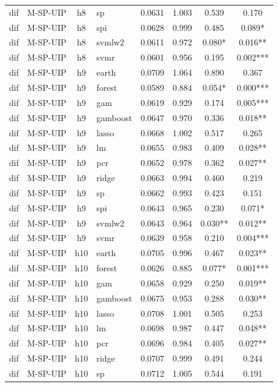 \begin{ThreePartTable}
\begin{longtable}[t]{llclcccc}
dif & M-SP-UIP & h8 & sp & 0.0631 & 1.003 & 0.539 & 0.170\\
dif & M-SP-UIP & h8 & spi & 0.0628 & 0.999 & 0.485 & 0.089*\\
dif & M-SP-UIP & h8 & svmlw2 & 0.0611 & 0.972 & 0.080* & 0.016**\\
dif & M-SP-UIP & h8 & svmr & 0.0601 & 0.956 & 0.195 & 0.002***\\
\addlinespace
dif & M-SP-UIP & h9 & earth & 0.0709 & 1.064 & 0.890 & 0.367\\
dif & M-SP-UIP & h9 & forest & 0.0589 & 0.884 & 0.054* & 0.000***\\
dif & M-SP-UIP & h9 & gam & 0.0619 & 0.929 & 0.174 & 0.005***\\
dif & M-SP-UIP & h9 & gamboost & 0.0647 & 0.970 & 0.336 & 0.018**\\
dif & M-SP-UIP & h9 & lasso & 0.0668 & 1.002 & 0.517 & 0.265\\
dif & M-SP-UIP & h9 & lm & 0.0655 & 0.983 & 0.409 & 0.028**\\
dif & M-SP-UIP & h9 & pcr & 0.0652 & 0.978 & 0.362 & 0.027**\\
dif & M-SP-UIP & h9 & ridge & 0.0663 & 0.994 & 0.460 & 0.219\\
dif & M-SP-UIP & h9 & sp & 0.0662 & 0.993 & 0.423 & 0.151\\
dif & M-SP-UIP & h9 & spi & 0.0643 & 0.965 & 0.230 & 0.071*\\
dif & M-SP-UIP & h9 & svmlw2 & 0.0643 & 0.964 & 0.030** & 0.012**\\
dif & M-SP-UIP & h9 & svmr & 0.0639 & 0.958 & 0.210 & 0.004***\\
\addlinespace
dif & M-SP-UIP & h10 & earth & 0.0705 & 0.996 & 0.467 & 0.023**\\
dif & M-SP-UIP & h10 & forest & 0.0626 & 0.885 & 0.077* & 0.001***\\
dif & M-SP-UIP & h10 & gam & 0.0658 & 0.929 & 0.250 & 0.019**\\
dif & M-SP-UIP & h10 & gamboost & 0.0675 & 0.953 & 0.288 & 0.030**\\
dif & M-SP-UIP & h10 & lasso & 0.0708 & 1.001 & 0.505 & 0.253\\
dif & M-SP-UIP & h10 & lm & 0.0698 & 0.987 & 0.447 & 0.048**\\
dif & M-SP-UIP & h10 & pcr & 0.0696 & 0.984 & 0.405 & 0.027**\\
dif & M-SP-UIP & h10 & ridge & 0.0707 & 0.999 & 0.491 & 0.244\\
dif & M-SP-UIP & h10 & sp & 0.0712 & 1.005 & 0.544 & 0.191\\

\end{longtable}
\end{ThreePartTable}
